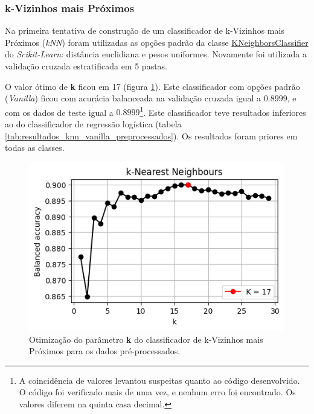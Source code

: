 \documentclass[final,5p]{elsarticle}
\numberwithin{equation}{section}
\begin{document}
    \subsubsection{k-Vizinhos mais Próximos}

        Na primeira tentativa de construção de um classificador de k-Vizinhos mais Próximos (\emph{kNN}) foram utilizadas as opções padrão da classe \href{https://scikit-learn.org/stable/modules/generated/sklearn.neighbors.KNeighborsClassifier.html}{KNeighborsClassifier} do \emph{Scikit-Learn}: distância euclidiana e pesos uniformes. Novamente foi utilizada a validação cruzada estratificada em 5 pastas.

        O valor ótimo de \textbf{k} ficou em 17 (figura \ref{fig:knn_melhor_k_preprocessados}). Este classificador com opções padrão (\emph{Vanilla}) ficou com acurácia balanceada na validação cruzada igual a $0.8999$, e com os dados de teste igual a $0.8999$\footnote{A coincidência de valores levantou suspeitas quanto ao código desenvolvido. O código foi verificado mais de uma vez, e nenhum erro foi encontrado. Os valores diferem na quinta casa decimal.}. Este classificador teve resultados inferiores ao do classificador de regressão logística (tabela \ref{tab:resultados_knn_vanilla_preprocessados}). Os resultados foram priores em todas as classes.

        \begin{figure}[hbt!]
            \includegraphics[width=0.95\columnwidth]{A_kNN_bestK.png}
            \caption{Otimização do parâmetro \textbf{k} do classificador de k-Vizinhos mais Próximos para os dados pré-processados.}
            \label{fig:knn_melhor_k_preprocessados}
        \end{figure}
\end{document}
